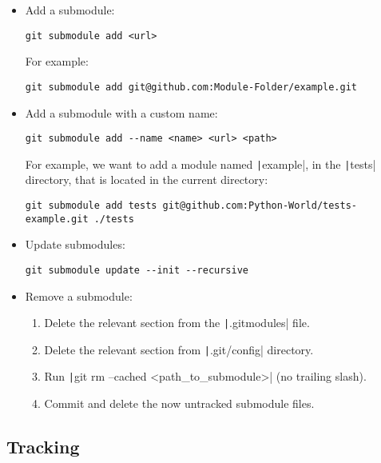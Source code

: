 \begin{itemize}
    \item Add a submodule:
    \begin{verbatim}
git submodule add <url>
    \end{verbatim}
    For example:
    \begin{verbatim}
git submodule add git@github.com:Module-Folder/example.git
    \end{verbatim}
    \item Add a submodule with a custom name:
    \begin{verbatim}
git submodule add --name <name> <url> <path>
    \end{verbatim}
    For example, we want to add a module named \texttt|example|, in the
    \texttt|tests| directory, that is located in the current
    directory:
    \begin{verbatim}
git submodule add tests git@github.com:Python-World/tests-example.git ./tests
    \end{verbatim}
    \item Update submodules:
    \begin{verbatim}
git submodule update --init --recursive
    \end{verbatim}
    \item Remove a submodule:
    \begin{enumerate}
        \item Delete the relevant section from the \texttt|.gitmodules| file.
        \item Delete the relevant section from \texttt|.git/config| directory.
        \item Run \texttt|git rm --cached <path_to_submodule>| (no trailing slash).
        \item Commit and delete the now untracked submodule files.
    \end{enumerate}
\end{itemize}


\subsection{Tracking}


